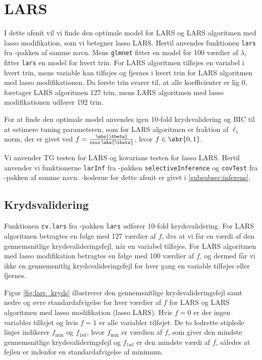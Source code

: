 \section{LARS}
I dette afsnit vil vi finde den optimale model for LARS og LARS algoritmen med lasso modifikation, som vi betegner lasso LARS. 
Hertil anvendes funktionen \texttt{lars} fra \Rlang-pakken af samme navn.
Mens \texttt{glmnet} fitter en model for 100 værdier af \(\lambda\), fitter \texttt{lars} en model for hvert trin.
For LARS algoritmen tilføjes en variabel i hvert trin, mens variable kan tilføjes og fjernes i hvert trin for LARS algoritmen med lasso modifikationen.
Da første trin svarer til, at alle koefficienter er lig 0, foretager LARS algoritmen 127 trin, mens LARS algoritmen med lasso modifikationen udfører 192 trin.

For at finde den optimale model anvendes igen 10-fold krydsvalidering og BIC til at estimere tuning parameteren, som for LARS algoritmen er fraktion af \(\ell_1\) norm, der er givet ved \(f = \frac{\abs{\tbeta}}{\max \abs{\tbeta}}\), hvor \(f \in \sbr{0,1}\).

Vi anvender TG testen for LARS og kovarians testen for lasso LARS.   
Hertil anvender vi funktionerne \texttt{larInf} fra \Rlang-pakken \texttt{selectiveInference} og \texttt{covTest} fra \Rlang-pakken af samme navn. 
\Rlang-koderne for dette afsnit er givet i \ref{subsubsec:inferens}.

\subsection{Krydsvalidering}
Funktionen \texttt{cv.lars} fra \Rlang-pakken \texttt{lars} udfører 10-fold krydsvalidering.
For LARS algoritmen betragtes en følge med 127 værdier af $f$, dvs at vi får en værdi af den gennemsnitlige krydsvalideringsfejl, når en variabel tilføjes.
For LARS algoritmen med lasso modifikation betragtes en følge med 100 værdier af $f$, og dermed får vi ikke en gennemsnitlig krydsvalideringsfejl for hver gang en variable tilføjes eller fjernes.

Figur \ref{fig:lars_kryds} illustrerer den gennemsnitlige krydsvalideringsfejl samt nedre og øvre standardafvigelse for hver værdier af $f$ for LARS og LARS algoritmen med lasso modifikation (lasso LARS).
Hvis $f = 0$ er der ingen variabler tilføjet og hvis $f=1$ er alle variabler tilføjet. 
De to lodrette stiplede linjer indikerer \(f_{\text{min}}\) og \(f_\text{1sd}\), hvor \(f_{\text{min}}\) er værdien af \(f\), som giver den mindste gennemsnitlige krydsvalideringsfejl og \(f_\text{1sd}\) er den mindste værdi af \(f\), således at fejlen er indenfor en standardafvigelse af minimum. 

